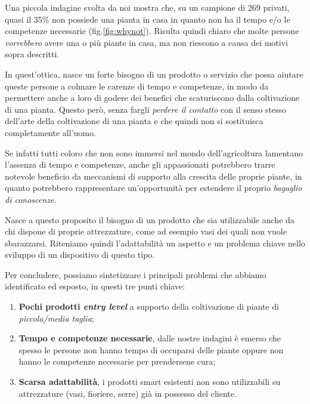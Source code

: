 Una piccola indagine svolta da noi mostra che, su un campione di 269 privati, quasi il 35\% non possiede una pianta in casa in quanto non ha il tempo e/o le competenze necessarie (fig.\ref{fig:whynot}).
Risulta quindi chiaro che molte persone \textit{vorrebbero} avere una o più piante in casa, ma non riescono a causa dei motivi sopra descritti.

In quest'ottica, nasce un forte bisogno di un prodotto o servizio che possa aiutare queste persone a colmare le carenze di tempo e competenze, in modo da permettere anche a loro di godere dei benefici che scaturiscono dalla coltivazione di una pianta. Questo però, senza fargli \textit{perdere il contatto} con il senso stesso dell'arte della coltivazione di una pianta e che quindi non si sostituisca completamente all'uomo.

Se infatti tutti coloro che non sono immersi nel mondo dell'agricoltura lamentano l'assenza di tempo e competenze, anche gli appassionati potrebbero trarre notevole beneficio da meccanismi di supporto alla crescita delle proprie piante, in quanto potrebbero rappresentare un'opportunità per estendere il proprio\textit{ bagaglio di conoscenze}.

Nasce a questo proposito il bisogno di un prodotto che sia utilizzabile anche da chi dispone di proprie attrezzature, come ad esempio vasi dei quali non vuole sbarazzarsi.
Riteniamo quindi l'adattabilità un aspetto e un problema chiave nello sviluppo di un dispositivo di questo tipo.

Per concludere, possiamo sintetizzare i principali problemi che abbiamo identificato ed esposto, in questi tre punti chiave:
\begin{enumerate}
	\item \textbf{Pochi prodotti \textit{entry level}} a supporto della coltivazione di piante di \textit{piccola/media taglia};
	
	\item \textbf{Tempo e competenze necessarie}, dalle nostre indagini è emerso che spesso le persone non hanno tempo di occuparsi delle piante oppure non hanno le competenze necessarie per prendersene cura;
	
	\item \textbf{Scarsa adattabilità}, i prodotti smart esistenti non sono utilizzabili su attrezzature (vasi, fioriere, serre) già in possesso del cliente.
\end{enumerate}
